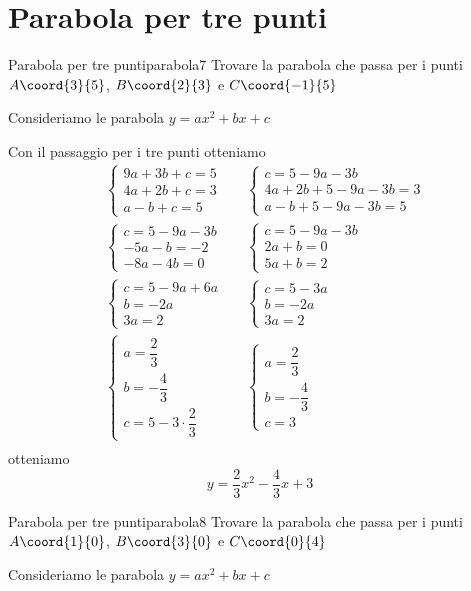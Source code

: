 \section{Parabola per tre punti}
\begin{esempiot}{Parabola per tre punti}{parabola7}
	Trovare la parabola che passa per i punti $A\coord{3}{5}$, $B\coord{2}{3}$ e $C\coord{-1}{5}$
\end{esempiot}
Consideriamo le parabola $y=ax^2+bx+c$

Con il passaggio per i tre punti otteniamo
\begin{align*}
	&\begin{cases}
		9a+3b+c=5\\4a+2b+c=3\\a-b+c=5
	\end{cases}
		&&\begin{cases}
			c=5-9a-3b\\4a+2b+5-9a-3b=3\\a-b+5-9a-3b=5
		\end{cases}\\
		&\begin{cases}
			c=5-9a-3b\\-5a-b=-2\\-8a-4b=0
		\end{cases}
		&&\begin{cases}
			c=5-9a-3b\\2a+b=0\\5a+b=2
		\end{cases}\\
		&\begin{cases}
			c=5-9a+6a\\b=-2a\\3a=2
		\end{cases}
		&&\begin{cases}
			c=5-3a\\b=-2a\\3a=2
		\end{cases}\\
			&\begin{cases}
		a=\dfrac{2}{3}\\b=-\dfrac{4}{3}\\c=5-3\cdot\dfrac{2}{3}
			\end{cases}
			&&\begin{cases}
			a=\dfrac{2}{3}\\b=-\dfrac{4}{3}\\c=3
			\end{cases}\\
\end{align*}
otteniamo\[y=\dfrac{2}{3}x^2-\dfrac{4}{3}x+3 \]
\begin{center}
	
	\label{fig:disegnoparabola7}
\end{center}
\begin{esempiot}{Parabola per tre punti}{parabola8}
	Trovare la parabola che passa per i punti $A\coord{1}{0}$, $B\coord{3}{0}$ e $C\coord{0}{4}$
\end{esempiot}
Consideriamo le parabola $y=ax^2+bx+c$

